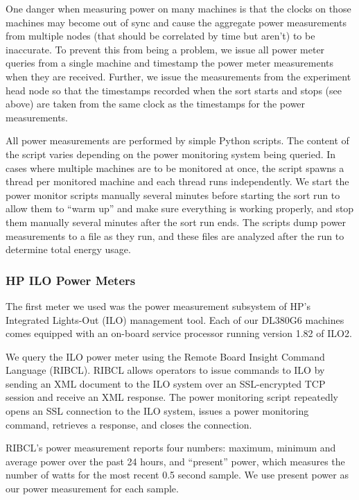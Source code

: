 One danger when measuring power on many machines is that the clocks on those
machines may become out of sync and cause the aggregate power measurements
from multiple nodes (that should be correlated by time but aren't) to be
inaccurate. To prevent this from being a problem, we issue all power meter
queries from a single machine and timestamp the power meter measurements when
they are received. Further, we issue the measurements from the experiment head
node so that the timestamps recorded when the sort starts and stops (see above)
are taken from the same clock as the timestamps for the power measurements.

All power measurements are performed by simple Python scripts. The content of
the script varies depending on the power monitoring system being queried. In
cases where multiple machines are to be monitored at once, the script spawns a
thread per monitored machine and each thread runs independently. We start the
power monitor scripts manually several minutes before starting the sort run to
allow them to ``warm up'' and make sure everything is working properly, and
stop them manually several minutes after the sort run ends. The scripts dump
power measurements to a file as they run, and these files are analyzed after
the run to determine total energy usage.

\subsubsection{HP ILO Power Meters}

The first meter we used was the power measurement subsystem of HP's Integrated
Lights-Out (ILO) management tool. Each of our DL380G6 machines comes equipped
with an on-board service processor running version 1.82 of ILO2.

We query the ILO power meter using the Remote Board Insight Command Language
(RIBCL). RIBCL allows operators to issue commands to ILO by sending an XML
document to the ILO system over an SSL-encrypted TCP session and receive an
XML response. The power monitoring script repeatedly opens an SSL connection to
the ILO system, issues a power monitoring command, retrieves a response, and
closes the connection.

RIBCL's power measurement reports four numbers: maximum, minimum and average
power over the past 24 hours, and ``present'' power, which measures the number
of watts for the most recent 0.5 second sample. We use present power as our
power measurement for each sample.

